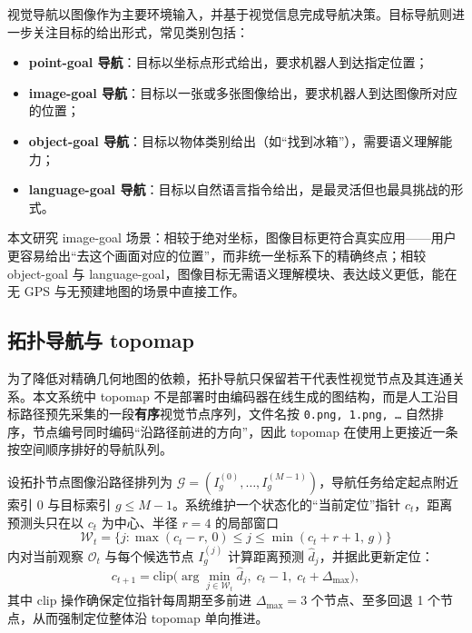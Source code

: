 视觉导航以图像作为主要环境输入，并基于视觉信息完成导航决策\cite{zhu2017targetdriven,anderson2018evaluation}。目标导航则进一步关注目标的给出形式，常见类别包括：
\begin{itemize}
    \item \textbf{point-goal 导航}\cite{ddppo2020}：目标以坐标点形式给出，要求机器人到达指定位置；
    \item \textbf{image-goal 导航}：目标以一张或多张图像给出，要求机器人到达图像所对应的位置；
    \item \textbf{object-goal 导航}：目标以物体类别给出（如``找到冰箱''），需要语义理解能力；
    \item \textbf{language-goal 导航}：目标以自然语言指令给出，是最灵活但也最具挑战的形式。
\end{itemize}
本文研究 image-goal 场景：相较于绝对坐标，图像目标更符合真实应用——用户更容易给出``去这个画面对应的位置''，而非统一坐标系下的精确终点；相较 object-goal 与 language-goal，图像目标无需语义理解模块、表达歧义更低，能在无 GPS 与无预建地图的场景中直接工作。

\subsection{拓扑导航与 topomap}

为了降低对精确几何地图的依赖，拓扑导航只保留若干代表性视觉节点及其连通关系\cite{savinov2018sptm,chaplot2020nts,shah2021ving}。本文系统中 topomap 不是部署时由编码器在线生成的图结构，而是人工沿目标路径预先采集的一段\textbf{有序}视觉节点序列，文件名按 \texttt{0.png, 1.png, \ldots} 自然排序，节点编号同时编码``沿路径前进的方向''，因此 topomap 在使用上更接近一条按空间顺序排好的导航队列。

设拓扑节点图像沿路径排列为 $\mathcal{G}=(I_g^{(0)}, \ldots, I_g^{(M-1)})$，导航任务给定起点附近索引 $0$ 与目标索引 $g\le M-1$。系统维护一个状态化的``当前定位''指针 $c_t$，距离预测头只在以 $c_t$ 为中心、半径 $r=4$ 的局部窗口
\begin{equation}
\mathcal{W}_t = \{j : \max(c_t-r,\,0) \le j \le \min(c_t+r+1,\,g)\}
\end{equation}
内对当前观察 $\mathcal{O}_t$ 与每个候选节点 $I_g^{(j)}$ 计算距离预测 $\hat d_j$，并据此更新定位：
\begin{equation}
c_{t+1} = \mathrm{clip}\bigl(\arg\min_{j\in\mathcal{W}_t} \hat d_j,\; c_t-1,\; c_t+\Delta_{\max}\bigr),
\end{equation}
其中 clip 操作确保定位指针每周期至多前进 $\Delta_{\max}=3$ 个节点、至多回退 1 个节点，从而强制定位整体沿 topomap 单向推进。


